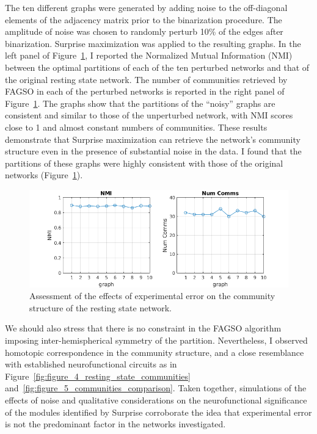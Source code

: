 The ten different graphs were generated by adding noise to the off-diagonal elements of the adjacency matrix prior to the binarization procedure. The amplitude of noise was chosen to randomly perturb 10\% of the edges after binarization. Surprise maximization was applied to the resulting graphs. In the left panel of Figure~\ref{fig:figure_9_nmi}, I reported the Normalized Mutual Information (NMI) between the optimal partitions of each of the ten perturbed networks and that of the original resting state network.
The number of communities retrieved by FAGSO in each of the perturbed networks is reported in the right panel of Figure~\ref{fig:figure_9_nmi}. The graphs show that the partitions of the ``noisy'' graphs are consistent and similar to those of the unperturbed network, with NMI scores close to 1 and almost constant numbers of communities.
These results demonstrate that Surprise maximization can retrieve the network's community structure even in the presence of substantial noise in the data.
I found that the partitions of these graphs were highly consistent with those of the original networks (Figure~\ref{fig:figure_9_nmi}).

\begin{figure}[ht]
\centering
\includegraphics[width=1\linewidth]{images/figure_9_nmi.png}
\caption{Assessment of the effects of experimental error on the community structure of the resting state network.}
\label{fig:figure_9_nmi}
\end{figure}

We should also stress that there is no constraint in the FAGSO algorithm imposing inter-hemispherical symmetry of the partition.
Nevertheless, I observed homotopic correspondence in the community structure, and a close resemblance with established neurofunctional circuits as in Figure~\ref{fig:figure_4_resting_state_communities} and~\ref{fig:figure_5_communities_comparison}. Taken together, simulations of the effects of noise and qualitative considerations on the neurofunctional significance of the modules identified by Surprise corroborate the idea that experimental error is not the predominant factor in the networks investigated.


